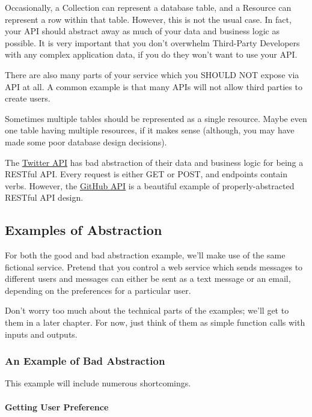 \documentclass{book}
\begin{document}
Occasionally, a Collection can represent a database table, and a Resource can represent a row within that table. However, this is not the usual case. In fact, your API should abstract away as much of your data and business logic as possible. It is very important that you don't overwhelm Third-Party Developers with any complex application data, if you do they won't want to use your API.

There are also many parts of your service which you SHOULD NOT expose via API at all. A common example is that many APIs will not allow third parties to create users.

Sometimes multiple tables should be represented as a single resource. Maybe even one table having multiple resources, if it makes sense (although, you may have made some poor database design decisions).

The \href{https://dev.twitter.com/docs/api/1.1}{Twitter API} has bad abstraction of their data and business logic for being a RESTful API. Every request is either GET or POST, and endpoints contain verbs. However, the \href{http://developer.github.com/v3/}{GitHub API} is a beautiful example of properly-abstracted RESTful API design.

\subsection{Examples of Abstraction}

For both the good and bad abstraction example, we'll make use of the same fictional service. Pretend that you control a web service which sends messages to different users and messages can either be sent as a text message or an email, depending on the preferences for a particular user.

Don't worry too much about the technical parts of the examples; we'll get to them in a later chapter. For now, just think of them as simple function calls with inputs and outputs.

\subsubsection{An Example of Bad Abstraction}

This example will include numerous shortcomings.

\paragraph{\textbf{Getting User Preference}}
\end{document}
